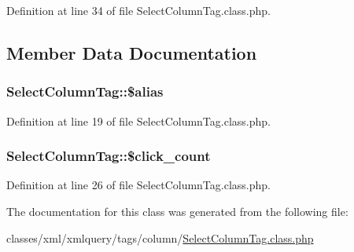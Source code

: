 Definition at line 34 of file Select\+Column\+Tag.\+class.\+php.



\subsection{Member Data Documentation}
\subsubsection[{\texorpdfstring{\$alias}{$alias}}]{\setlength{\rightskip}{0pt plus 5cm}Select\+Column\+Tag\+::\$alias}\hypertarget{classSelectColumnTag_a152fca9e152d65e4697ad823ffaa101b}{}\label{classSelectColumnTag_a152fca9e152d65e4697ad823ffaa101b}


Definition at line 19 of file Select\+Column\+Tag.\+class.\+php.

\subsubsection[{\texorpdfstring{\$click\+\_\+count}{$click_count}}]{\setlength{\rightskip}{0pt plus 5cm}Select\+Column\+Tag\+::\$click\+\_\+count}\hypertarget{classSelectColumnTag_a5965b8a6c68685c6b99dd88f4fd87f52}{}\label{classSelectColumnTag_a5965b8a6c68685c6b99dd88f4fd87f52}


Definition at line 26 of file Select\+Column\+Tag.\+class.\+php.



The documentation for this class was generated from the following file\+:\begin{DoxyCompactItemize}
\item 
classes/xml/xmlquery/tags/column/\hyperlink{SelectColumnTag_8class_8php}{Select\+Column\+Tag.\+class.\+php}\end{DoxyCompactItemize}
